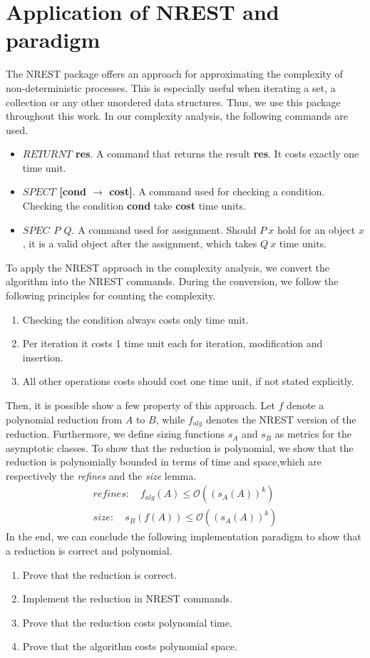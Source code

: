 \section{Application of NREST and paradigm}
The NREST package offers an approach for approximating the complexity of non-deterministic processes.
This is especially useful when iterating a set, a collection or any other unordered data structures. Thus,
we use this package throughout this work. In our complexity analysis, the following commands are used. 
\begin{itemize}
    \item \textbf{$RETURNT$ res}. A command that returns the result \textbf{res}. It costs exactly one time unit.
    \item \textbf{$SPECT$ [cond $\rightarrow$ cost]}. A command used for checking a condition. Checking the condition \textbf{cond}
    take \textbf{cost} time units.
    \item \textbf{$SPEC$ $P$ $Q$}. A command used for assignment. Should $P\ x$ hold for an object $x$, it is a valid object after the assignment,
    which takes $Q\ x$ time units.
\end{itemize}
To apply the NREST approach in the complexity analysis, we convert the algorithm into the NREST commands.
During the conversion, we follow the following principles for counting the complexity.
\begin{enumerate}
    \item Checking the condition always costs only time unit. 
    \item Per iteration it costs 1 time unit each for iteration, modification and insertion.
    \item All other operations costs should cost one time unit, if not stated explicitly.
\end{enumerate}
Then, it is possible show a few property of this approach. 
Let $f$ denote a polynomial reduction from $A$ to $B$, while $f_{alg}$ denotes the NREST version of the reduction.
Furthermore, we define sizing functions $s_A$ and $s_B$ as metrics for the asymptotic classes.
To show that the reduction is polynomial, we show that the reduction is polynomially bounded in terms 
of time and space,which are respectively the \textit{refines} and the \textit{size} lemma.
\begin{align}
    refines: \quad f_{alg}(A) \leq \mathcal{O}((s_A(A))^k) \\
    size: \quad s_B (f(A)) \leq \mathcal{O}((s_A(A))^k)
\end{align}
In the end, we can conclude the following implementation paradigm to show that a reduction is correct and polynomial.
\begin{enumerate}
    \item Prove that the reduction is correct.
    \item Implement the reduction in NREST commands.
    \item Prove that the reduction costs polynomial time.
    \item Prove that the algorithm costs polynomial space.
\end{enumerate}
